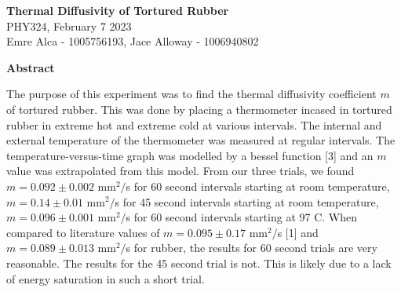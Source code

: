 \documentclass[11pt]{article}
\begin{document}
\begin{center}
    \Large {}  \textbf{Thermal Diffusivity of Tortured Rubber}\\
    \vspace{5pt} 
    \large PHY324, February 7 2023\\
    \vspace{5pt}
    Emre Alca - 1005756193, Jace Alloway - 1006940802
\end{center}

\nd \hrulefill

\vspace{15pt}



 \selectfont \textbf{Abstract}

 \selectfont 


The purpose of this experiment was to find the thermal diffusivity coefficient $m$ of tortured rubber. This was done by placing a thermometer incased in tortured rubber in extreme hot and extreme cold at various intervals. The internal and external temperature of the thermometer was measured at regular intervals. The temperature-versus-time graph was modelled by a bessel function [3] and an $m$ value was extrapolated from this model. From our three trials, we found $m = 0.092 \pm 0.002$ mm$^2/$s for 60 second intervals starting at room temperature, $m = 0.14 \pm 0.01$ mm$^2/$s for 45 second intervals starting at room temperature, $m = 0.096 \pm 0.001$ mm$^2/$s for 60 second intervals starting at 97 \textdegree C. When compared to literature values of $m = 0.095 \pm 0.17$ mm$^2/$s [1] and $m = 0.089 \pm 0.013$ mm$^2/$s for rubber, the results for 60 second trials are very reasonable. The results for the 45 second trial is not. This is likely due to a lack of energy saturation in such a short trial.


\nd \hrulefill

\vspace{5pt}
\end{document}
